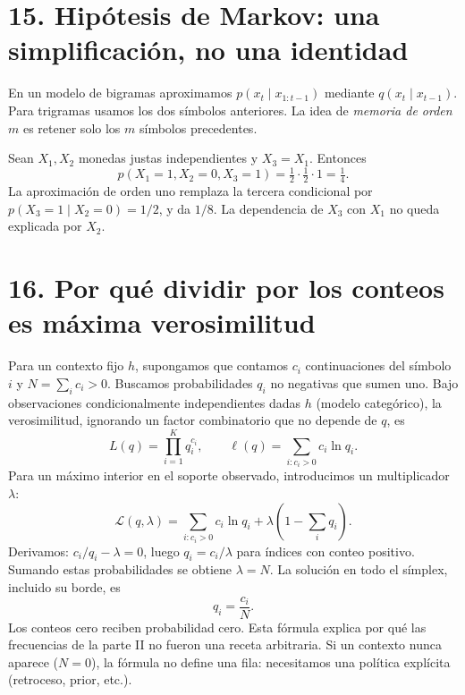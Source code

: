 \section*{15. Hipótesis de Markov: una simplificación, no una identidad}
En un modelo de bigramas aproximamos $p(x_t\mid x_{1:t-1})$ mediante $q(x_t\mid x_{t-1})$. Para trigramas usamos los dos símbolos anteriores. La idea de \emph{memoria de orden $m$} es retener solo los $m$ símbolos precedentes.
\begin{center}
\end{center}
\begin{ejemplo}
Sean $X_1,X_2$ monedas justas independientes y $X_3=X_1$. Entonces
\[
p(X_1=1,X_2=0,X_3=1)=\tfrac12\cdot\tfrac12\cdot1=\tfrac14.
\]
La aproximación de orden uno remplaza la tercera condicional por $p(X_3=1\mid X_2=0)=1/2$, y da $1/8$. La dependencia de $X_3$ con $X_1$ no queda explicada por $X_2$.
\end{ejemplo}

\section*{16. Por qué dividir por los conteos es máxima verosimilitud}
Para un contexto fijo $h$, supongamos que contamos $c_i$ continuaciones del símbolo $i$ y $N=\sum_i c_i>0$. Buscamos probabilidades $q_i$ no negativas que sumen uno. Bajo observaciones condicionalmente independientes dadas $h$ (modelo categórico), la verosimilitud, ignorando un factor combinatorio que no depende de $q$, es
\[
L(q)=\prod_{i=1}^{K} q_i^{c_i},\qquad
\ell(q)=\sum_{i:c_i>0} c_i\ln q_i.
\]
Para un máximo interior en el soporte observado, introducimos un multiplicador $\lambda$:
\[
\mathcal L(q,\lambda)=\sum_{i:c_i>0}c_i\ln q_i+\lambda(1-\sum_iq_i).
\]
Derivamos: $c_i/q_i-\lambda=0$, luego $q_i=c_i/\lambda$ para índices con conteo positivo. Sumando estas probabilidades se obtiene $\lambda=N$. La solución en todo el símplex, incluido su borde, es
\[
\boxed{\widehat q_i=\frac{c_i}{N}.}
\]
Los conteos cero reciben probabilidad cero. Esta fórmula explica por qué las frecuencias de la parte II no fueron una receta arbitraria. Si un contexto nunca aparece ($N=0$), la fórmula no define una fila: necesitamos una política explícita (retroceso, prior, etc.).

